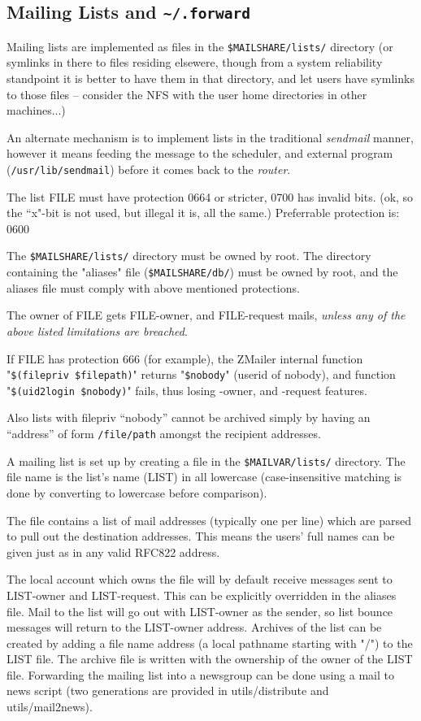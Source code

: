 \subsection{Mailing Lists and {\tt\~{}/.forward}}%
\label{mailing_list_maintenance}


Mailing lists are implemented as files in the {\tt \$MAILSHARE/lists/} 
directory (or symlinks in there to files residing elsewere, though from a system
reliability standpoint it is better to have them in that directory,
and let users have symlinks to those files -- consider the NFS
with the user home directories in other machines...)

An alternate mechanism is to implement lists in the traditional {\em sendmail}
manner, however it means feeding the message to the scheduler, and
external program ({\tt /usr/lib/sendmail}) before it comes back to the
{\em router}.

The list FILE must have protection 0664 or stricter, 0700 has invalid bits.
(ok, so the ``x"-bit is not used, but illegal it is, all the same.)
Preferrable protection is: 0600

The {\tt \$MAILSHARE/lists/} directory must be owned by root.
The directory containing the "aliases" file  ({\tt \$MAILSHARE/db/}) 
must be owned by root, and the aliases file must comply with above mentioned 
protections.

The owner of FILE gets FILE-owner, and FILE-request mails,
{\em unless any of the above listed limitations are breached}.

If FILE has protection 666 (for example), the ZMailer internal function
"{\tt \$(filepriv \$filepath)}" 
returns "{\tt \$nobody}" (userid of nobody), and  function
"{\tt \$(uid2login \$nobody)}" fails, thus losing -owner, and 
-request features.

Also lists with filepriv ``nobody'' cannot be archived simply
by having an ``address'' of form {\tt /file/path} amongst the
recipient addresses.

A mailing list is set up by creating a file in the 
{\tt \$MAILVAR/lists/} directory.
The file name is the list's name (LIST) in all lowercase
(case-insensitive matching is done by converting to lowercase
before comparison).

The file contains a list of mail addresses (typically one per line)
which are parsed to pull out the destination addresses.  This means
the users' full names can be given just as in any valid RFC822 address.

The local account which owns the file will by default receive messages
sent to LIST-owner and LIST-request.  This can be explicitly overridden
in the aliases file.  Mail to the list will go out with LIST-owner as
the sender, so list bounce messages will return to the LIST-owner
address.  Archives of the list can be created by adding a file name
address (a local pathname starting with "/") to the LIST file.  The
archive file is written with the ownership of the owner of the LIST
file.  Forwarding the mailing list into a newsgroup
can be done using a mail to news script (two generations are provided
in utils/distribute and utils/mail2news).



